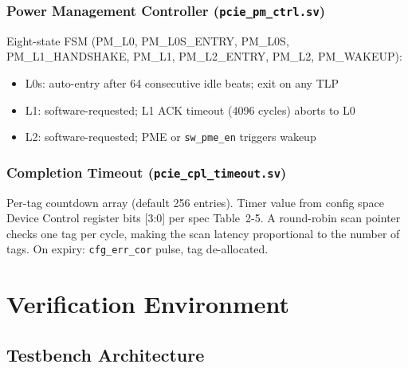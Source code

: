 \documentclass[12pt,a4paper]{report}
\begin{document}
\subsection{Power Management Controller (\texttt{pcie\_pm\_ctrl.sv})}

Eight-state FSM (PM\_L0, PM\_L0S\_ENTRY, PM\_L0S, PM\_L1\_HANDSHAKE,
PM\_L1, PM\_L2\_ENTRY, PM\_L2, PM\_WAKEUP):

\begin{itemize}[noitemsep]
  \item L0s: auto-entry after 64 consecutive idle beats; exit on any TLP
  \item L1: software-requested; L1 ACK timeout (4096 cycles) aborts to L0
  \item L2: software-requested; PME or \texttt{sw\_pme\_en} triggers wakeup
\end{itemize}

\subsection{Completion Timeout (\texttt{pcie\_cpl\_timeout.sv})}

Per-tag countdown array (default 256 entries). Timer value from config space
Device Control register bits [3:0] per spec Table~2-5. A round-robin scan
pointer checks one tag per cycle, making the scan latency proportional to
the number of tags. On expiry: \texttt{cfg\_err\_cor} pulse, tag de-allocated.

\chapter{Verification Environment}\label{ch:verif}

\section{Testbench Architecture}
\end{document}
